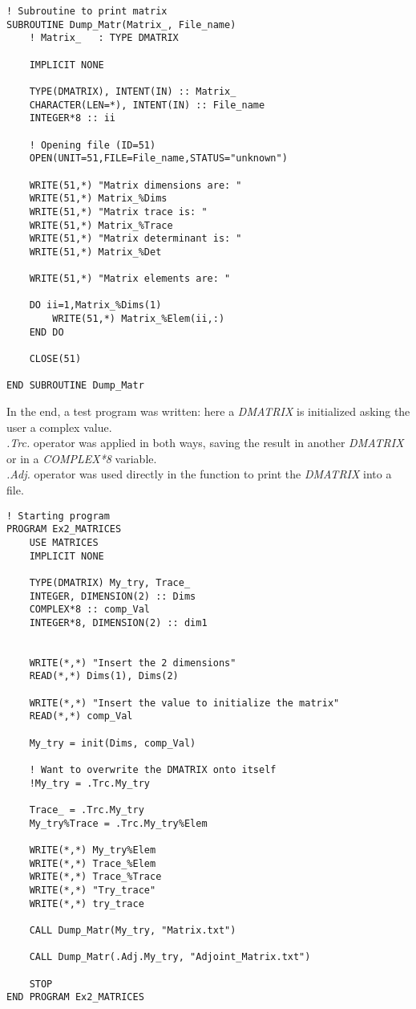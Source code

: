 \documentclass[12pt, a4paper, notitlepage]{report}
\begin{document}
\begin{lstlisting}
! Subroutine to print matrix
SUBROUTINE Dump_Matr(Matrix_, File_name)
	! Matrix_	: TYPE DMATRIX
	
	IMPLICIT NONE
	
	TYPE(DMATRIX), INTENT(IN) :: Matrix_
	CHARACTER(LEN=*), INTENT(IN) :: File_name
	INTEGER*8 :: ii
	
	! Opening file (ID=51)
	OPEN(UNIT=51,FILE=File_name,STATUS="unknown")
	
	WRITE(51,*) "Matrix dimensions are: "
	WRITE(51,*) Matrix_%Dims
	WRITE(51,*) "Matrix trace is: "
	WRITE(51,*) Matrix_%Trace
	WRITE(51,*) "Matrix determinant is: "
	WRITE(51,*) Matrix_%Det
	
	WRITE(51,*) "Matrix elements are: "
	
	DO ii=1,Matrix_%Dims(1)
		WRITE(51,*) Matrix_%Elem(ii,:)
	END DO
	
	CLOSE(51)

END SUBROUTINE Dump_Matr
\end{lstlisting}

\vspace{0.7cm}

In the end, a test program was written: here a \textit{DMATRIX} is initialized asking the user a complex value.\\
\textit{.Trc.} operator was applied in both ways, saving the result in another \textit{DMATRIX} or in a \textit{COMPLEX*8} variable.\\ \textit{.Adj.} operator was used directly in the function to print the \textit{DMATRIX} into a file.\\

\begin{lstlisting}
! Starting program
PROGRAM Ex2_MATRICES
	USE MATRICES
	IMPLICIT NONE
	
	TYPE(DMATRIX) My_try, Trace_
	INTEGER, DIMENSION(2) :: Dims
	COMPLEX*8 :: comp_Val
	INTEGER*8, DIMENSION(2) :: dim1
	
	
	WRITE(*,*) "Insert the 2 dimensions"
	READ(*,*) Dims(1), Dims(2)
	
	WRITE(*,*) "Insert the value to initialize the matrix"
	READ(*,*) comp_Val
	
	My_try = init(Dims, comp_Val)
	
	! Want to overwrite the DMATRIX onto itself
	!My_try = .Trc.My_try
	
	Trace_ = .Trc.My_try
	My_try%Trace = .Trc.My_try%Elem
	
	WRITE(*,*) My_try%Elem
	WRITE(*,*) Trace_%Elem
	WRITE(*,*) Trace_%Trace
	WRITE(*,*) "Try_trace"
	WRITE(*,*) try_trace
	
	CALL Dump_Matr(My_try, "Matrix.txt")
	
	CALL Dump_Matr(.Adj.My_try, "Adjoint_Matrix.txt")
	
	STOP
END PROGRAM Ex2_MATRICES
\end{lstlisting}
\end{document}
